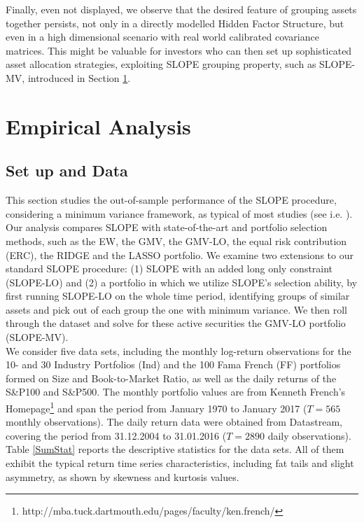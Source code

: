 \documentclass[12pt, a4paper]{article}
\begin{document}
%
\noindent
Finally, even not displayed, we observe that the desired feature of grouping assets together persists, not only in a directly modelled Hidden Factor Structure, but even in a high dimensional scenario with real world calibrated covariance matrices. This might be valuable for investors who can then set up sophisticated asset allocation strategies, exploiting SLOPE grouping property, such as SLOPE-MV, introduced in Section \ref{EmpiricalData}.

\section{Empirical Analysis}\label{EmpiricalData} %

\subsection{Set up and Data}\label{Data} %

This section studies the out-of-sample performance of the SLOPE procedure, considering a minimum variance framework, as typical of most studies (see i.e. \cite{Jagannathan2003, Brodie2009, DeMiguel2009a, Giuzio2016a}). Our analysis compares SLOPE with state-of-the-art and portfolio selection methods, such as the EW, the GMV, the GMV-LO, the equal risk contribution (ERC), the RIDGE and the LASSO portfolio. We examine two extensions to our standard SLOPE procedure: (1) SLOPE with an added long only constraint (SLOPE-LO) and (2) a portfolio in which we utilize SLOPE's selection ability, by first running SLOPE-LO on the whole time period, identifying groups of similar assets and pick out of each group the one with minimum variance. We then roll through the dataset and solve for these active securities the GMV-LO portfolio (SLOPE-MV).\\
We consider five data sets, including the monthly log-return observations for the 10- and 30 Industry Portfolios (Ind) and the 100 Fama French (FF) portfolios formed on Size and Book-to-Market Ratio, as well as the daily returns of the S\&P100 and S\&P500. The monthly portfolio values are from Kenneth French's Homepage\footnote{http://mba.tuck.dartmouth.edu/pages/faculty/ken.french/} and span the period from January 1970 to January 2017 ($T=565$ monthly observations). The daily return data were obtained from Datastream, covering the period from 31.12.2004 to 31.01.2016 ($T= 2890$ daily observations). Table \ref{SumStat} reports the descriptive statistics for the data sets. All of them exhibit the typical return time series characteristics, including fat tails and slight asymmetry, as shown by skewness and kurtosis values.
\end{document}

